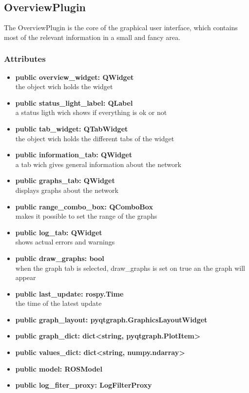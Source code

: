 \subsection{OverviewPlugin}
The OverviewPlugin is the core of the graphical user interface, which
contains most of the relevant information in a small and fancy area.
\subsubsection{Attributes}
\begin{itemize}
  \item \textbf{public overview\_widget: QWidget}\\
  the object wich holds the widget
  \item \textbf{public status\_light\_label: QLabel}\\
  a status ligth wich shows if everything is ok or not
  \item \textbf{public tab\_widget: QTabWidget}\\
  the object wich holds the different tabs of the widget
  \item \textbf{public information\_tab: QWidget}\\
  a tab wich gives general information about the network 
  \item \textbf{public graphs\_tab: QWidget}\\
  displays graphs about the network
  \item \textbf{public range\_combo\_box: QComboBox}\\
  makes it possible to set the range of the graphs
  \item \textbf{public log\_tab: QWidget}\\
  shows actual errors and warnings
  \item \textbf{public draw\_graphs: bool}\\
  when the graph tab is selected, draw\_graphs is set on true an the graph will
  appear
  \item \textbf{public last\_update: rospy.Time}\\
  the time of the latest update
  \item \textbf{public graph\_layout: pyqtgraph.GraphicsLayoutWidget}\\
  
  \item \textbf{public graph\_dict: dict<string, pyqtgraph.PlotItem>}\\
  
  \item \textbf{public values\_dict: dict<string, numpy.ndarray>}\\
  
  \item \textbf{public model: ROSModel}\\
  
  \item \textbf{public log\_fiter\_proxy: LogFilterProxy}\\
  
\end{itemize}
